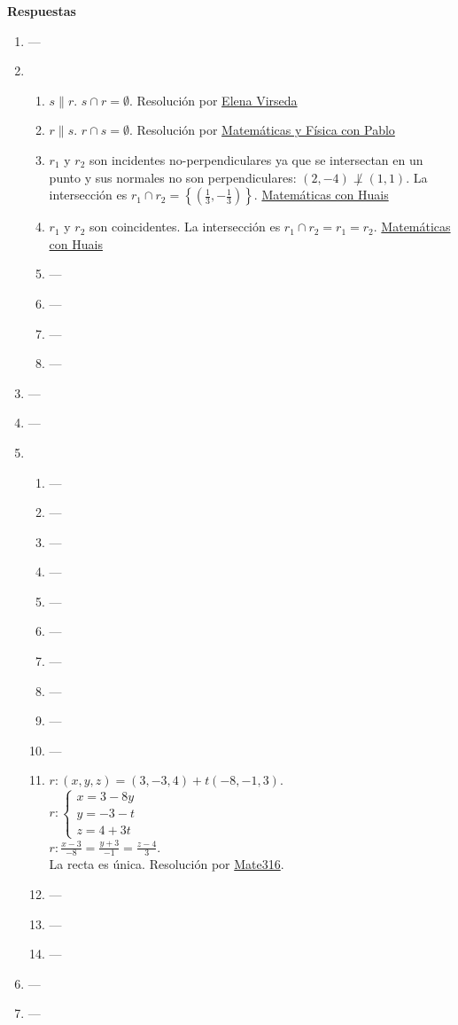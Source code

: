 \documentclass[a4paper]{article}
\newcommand{\exercise}{\item}
\begin{document}
\vspace{20pt} 
 \textbf{Respuestas}\begin{enumerate}\exercise---\exercise\begin{enumerate} [label=(\alph*)]		\item $s \parallel r$. $s \cap r=\emptyset$.  Resolución por \href{https://youtu.be/cHsXMw3V4mQ}{Elena Virseda}
		\item $r \parallel s$. $r \cap s=\emptyset$. Resolución por \href{https://youtu.be/MPUh70MKVUY}{Matemáticas y Física con Pablo}
		\item $r_1$ y $r_2$ son incidentes no-perpendiculares ya que se intersectan en un punto y sus normales no son perpendiculares: $(2,-4) \not\perp (1,1)$. La intersección es $r_1 \cap r_2=\left\{ \left(\frac{1}{3},-\frac{1}{3}\right)\right\}$. \href{https://youtu.be/LgIU8pd8DeM?t=97}{Matemáticas con Huais}
		\item $r_1$ y $r_2$ son coincidentes. La intersección es $r_1 \cap r_2=r_1=r_2$. \href{https://youtu.be/LgIU8pd8DeM?t=884}{Matemáticas con Huais}
\item ---\item ---\item ---\item ---\end{enumerate}\exercise---\exercise---\exercise\begin{enumerate} [label=(\alph*)]\item ---\item ---\item ---\item ---\item ---\item ---\item ---\item ---\item ---\item ---		\item $r: (x,y,z)=(3,-3,4)+t(-8,-1,3)$. \\ $r: \left\{\begin{matrix}x=3-8y\\y=-3-t\\z=4+3t\end{matrix}\right.$ \\ $r: \displaystyle{\frac{x-3}{-8}=\frac{y+3}{-1}=\frac{z-4}{3}}$. \\ La recta es única. Resolución por \href{https://youtu.be/KebOzsUUmq4?t=458}{Mate316}.
\item ---\item ---\item ---\end{enumerate}\exercise---\exercise---\end{enumerate}
\end{document}
